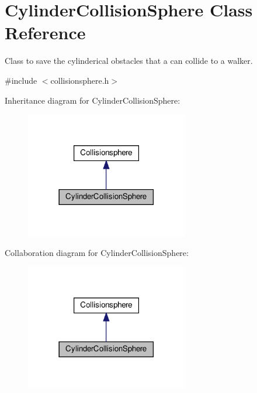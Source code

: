 \hypertarget{class_cylinder_collision_sphere}{}\section{Cylinder\+Collision\+Sphere Class Reference}
\label{class_cylinder_collision_sphere}


Class to save the cylinderical obstacles that a can collide to a walker.  




{\ttfamily \#include $<$collisionsphere.\+h$>$}



Inheritance diagram for Cylinder\+Collision\+Sphere\+:
\nopagebreak
\begin{figure}[H]
\begin{center}
\leavevmode
\includegraphics[width=201pt]{class_cylinder_collision_sphere__inherit__graph}
\end{center}
\end{figure}


Collaboration diagram for Cylinder\+Collision\+Sphere\+:
\nopagebreak
\begin{figure}[H]
\begin{center}
\leavevmode
\includegraphics[width=201pt]{class_cylinder_collision_sphere__coll__graph}
\end{center}
\end{figure}
